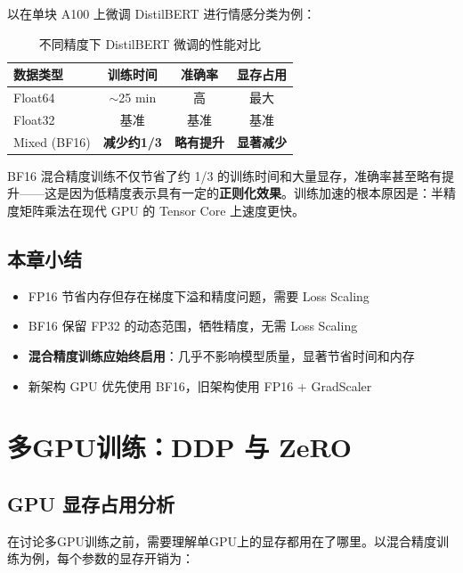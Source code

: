 \documentclass[a4paper]{article}
\begin{document}
以在单块 A100 上微调 DistilBERT 进行情感分类为例：

\begin{table}[H]
\centering
\begin{tabular}{lccc}
\toprule
\textbf{数据类型} & \textbf{训练时间} & \textbf{准确率} & \textbf{显存占用} \\
\midrule
Float64      & $\sim$25 min & 高 & 最大 \\
Float32      & 基准     & 基准 & 基准 \\
Mixed (BF16) & \textbf{减少约1/3} & \textbf{略有提升} & \textbf{显著减少} \\
\bottomrule
\end{tabular}
\caption{不同精度下 DistilBERT 微调的性能对比}
\end{table}

BF16 混合精度训练不仅节省了约 1/3 的训练时间和大量显存，准确率甚至略有提升——这是因为低精度表示具有一定的\textbf{正则化效果}。训练加速的根本原因是：半精度矩阵乘法在现代 GPU 的 Tensor Core 上速度更快。

\subsection{本章小结}

\begin{itemize}
    \item FP16 节省内存但存在梯度下溢和精度问题，需要 Loss Scaling
    \item BF16 保留 FP32 的动态范围，牺牲精度，无需 Loss Scaling
    \item \textbf{混合精度训练应始终启用}：几乎不影响模型质量，显著节省时间和内存
    \item 新架构 GPU 优先使用 BF16，旧架构使用 FP16 + GradScaler
\end{itemize}


\section{多GPU训练：DDP 与 ZeRO}

\subsection{GPU 显存占用分析}

在讨论多GPU训练之前，需要理解单GPU上的显存都用在了哪里。以混合精度训练为例，每个参数的显存开销为：


\end{document}
